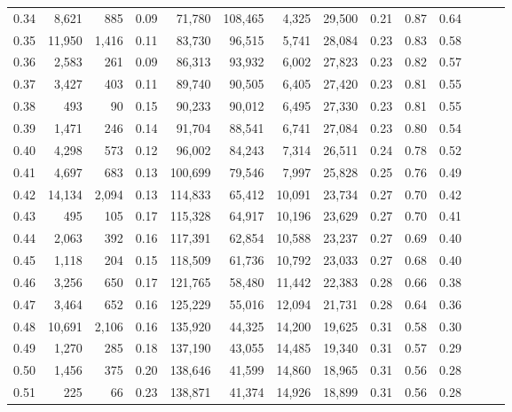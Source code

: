 \begin{tabular}{rrrrrrrrrrrrrr}
0.34 &   8,621 &    885 &  0.09 &   71,780 &  108,465 &   4,325 &  29,500 &  0.21 &  0.87 &      0.64 \\
0.35 &  11,950 &  1,416 &  0.11 &   83,730 &   96,515 &   5,741 &  28,084 &  0.23 &  0.83 &      0.58 \\
0.36 &   2,583 &    261 &  0.09 &   86,313 &   93,932 &   6,002 &  27,823 &  0.23 &  0.82 &      0.57 \\
0.37 &   3,427 &    403 &  0.11 &   89,740 &   90,505 &   6,405 &  27,420 &  0.23 &  0.81 &      0.55 \\
0.38 &     493 &     90 &  0.15 &   90,233 &   90,012 &   6,495 &  27,330 &  0.23 &  0.81 &      0.55 \\
0.39 &   1,471 &    246 &  0.14 &   91,704 &   88,541 &   6,741 &  27,084 &  0.23 &  0.80 &      0.54 \\
0.40 &   4,298 &    573 &  0.12 &   96,002 &   84,243 &   7,314 &  26,511 &  0.24 &  0.78 &      0.52 \\
0.41 &   4,697 &    683 &  0.13 &  100,699 &   79,546 &   7,997 &  25,828 &  0.25 &  0.76 &      0.49 \\
0.42 &  14,134 &  2,094 &  0.13 &  114,833 &   65,412 &  10,091 &  23,734 &  0.27 &  0.70 &      0.42 \\
0.43 &     495 &    105 &  0.17 &  115,328 &   64,917 &  10,196 &  23,629 &  0.27 &  0.70 &      0.41 \\
0.44 &   2,063 &    392 &  0.16 &  117,391 &   62,854 &  10,588 &  23,237 &  0.27 &  0.69 &      0.40 \\
0.45 &   1,118 &    204 &  0.15 &  118,509 &   61,736 &  10,792 &  23,033 &  0.27 &  0.68 &      0.40 \\
0.46 &   3,256 &    650 &  0.17 &  121,765 &   58,480 &  11,442 &  22,383 &  0.28 &  0.66 &      0.38 \\
0.47 &   3,464 &    652 &  0.16 &  125,229 &   55,016 &  12,094 &  21,731 &  0.28 &  0.64 &      0.36 \\
0.48 &  10,691 &  2,106 &  0.16 &  135,920 &   44,325 &  14,200 &  19,625 &  0.31 &  0.58 &      0.30 \\
0.49 &   1,270 &    285 &  0.18 &  137,190 &   43,055 &  14,485 &  19,340 &  0.31 &  0.57 &      0.29 \\
0.50 &   1,456 &    375 &  0.20 &  138,646 &   41,599 &  14,860 &  18,965 &  0.31 &  0.56 &      0.28 \\
0.51 &     225 &     66 &  0.23 &  138,871 &   41,374 &  14,926 &  18,899 &  0.31 &  0.56 &      0.28 \\

\end{tabular}
